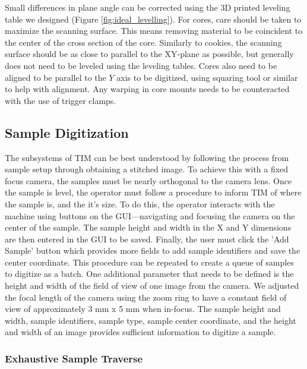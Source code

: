 \documentclass[a4paper,12pt]{article}
\begin{document}
Small differences in plane angle can be corrected using the 3D printed leveling table we designed (Figure \ref{fig:ideal_levelling}). 
For cores, care should be taken to maximize the scanning surface. This means removing material to be coincident to the center of the cross section of the core. 
Similarly to cookies, the scanning surface should be as close to parallel to the XY-plane as possible, but generally does not need to be leveled using the leveling tables.
Cores also need to be aligned to be parallel to the $Y$ axis to be digitized, using squaring tool or similar to help with alignment. Any warping in core mounts needs to be counteracted with the use of trigger clamps. 

\subsection{Sample Digitization} %

The subsystems of TIM can be best understood by following the process from sample setup through obtaining a stitched image. 
To achieve this with a fixed focus camera, the samples must be nearly orthogonal to the camera lens. 
Once the sample is level, the operator must follow a procedure to inform TIM of where the sample is, and the it's size. 
To do this, the operator interacts with the machine using buttons on the GUI---navigating and focusing the camera on the center of the sample. 
The sample height and width in the X and Y dimensions are then entered in the GUI to be saved. Finally, the user must click the 'Add Sample' button which provides more fields to add sample identifiers and save the center coordinate.
This procedure can be repeated to create a queue of samples to digitize as a batch. One additional parameter that needs to be defined is the height and width of the field of view of one image from the camera. 
We adjusted the focal length of the camera using the zoom ring to have a constant field of view of approximately 3 mm x 5 mm when in-focus.  
The sample height and width, sample identifiers, sample type, sample center coordinate, and the height and width of an image provides sufficient information to digitize a sample.

\subsubsection{Exhaustive Sample Traverse}  
\end{document}
